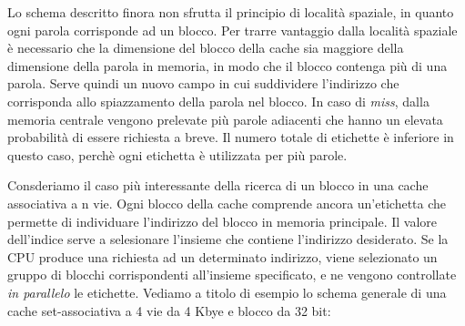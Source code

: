 \begin{figure}[ht]
    \centering
    \setlength{\fboxrule}{0.5pt} %
    \setlength{\fboxsep}{0pt}    %
\end{figure}

\noindent Lo schema descritto finora non sfrutta il principio di località spaziale, in quanto ogni parola corrisponde ad un blocco. Per trarre vantaggio dalla località spaziale è necessario che la dimensione del blocco della cache sia maggiore della dimensione della parola in memoria, in modo che il blocco contenga più di una parola. Serve quindi un nuovo campo in cui suddividere l'indirizzo che corrisponda allo spiazzamento della parola nel blocco. In caso di \textit{miss}, dalla memoria centrale vengono prelevate più parole adiacenti che hanno un elevata probabilità di essere richiesta a breve. Il numero totale di etichette è inferiore in questo caso, perchè ogni etichetta è utilizzata per più parole. 

\noindent Consderiamo il caso più interessante della ricerca di un blocco in una cache associativa a n vie.
Ogni blocco della cache comprende ancora un'etichetta che permette di individuare l'indirizzo del blocco in memoria principale. Il valore dell'indice serve a selesionare l'insieme che contiene l'indirizzo desiderato. Se la CPU produce una richiesta ad un determinato indirizzo, viene selezionato un gruppo di blocchi corrispondenti all'insieme specificato, e ne vengono controllate \textit{in parallelo} le etichette. 
Vediamo a titolo di esempio lo schema generale di una cache set-associativa a 4 vie da 4 Kbye e blocco da 32 bit:

